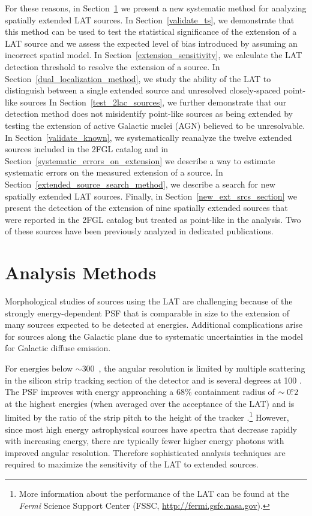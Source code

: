 \documentclass[12pt,preprint]{aastex}
\newcommand{\mev}{\text{MeV}\xspace}
\newcommand{\gev}{\text{GeV}\xspace}
\newcommand{\fermi}{\textit{Fermi}\xspace}
\begin{document}
 For these reasons, in Section~\ref{analysis_methods_section}
we present a new systematic method for analyzing spatially extended
LAT sources.  
In Section~\ref{validate_ts}, we demonstrate
that this method can be used to test the statistical significance of the
extension of a LAT source and we assess the expected level of bias 
introduced by assuming an incorrect spatial model.
In Section~\ref{extension_sensitivity},
we calculate the LAT detection threshold to resolve the extension
of a source.
In Section~\ref{dual_localization_method}, we
study the ability of the LAT to 
distinguish between a single extended source and unresolved closely-spaced point-like sources
In Section~\ref{test_2lac_sources}, we further demonstrate that our
detection method does not misidentify point-like sources as being
extended by testing the extension of active Galactic nuclei (AGN)
believed to be unresolvable.  In Section~\ref{validate_known},
we systematically reanalyze the twelve extended sources included
in the 2FGL catalog and in Section~\ref{systematic_errors_on_extension}
we describe a way to estimate systematic errors on the measured extension of a source.
In Section~\ref{extended_source_search_method}, we
describe a search for new spatially extended LAT sources. Finally,
in Section~\ref{new_ext_srcs_section} we present the detection of the
extension of nine spatially extended sources that were reported in the 2FGL catalog
but treated as point-like in the analysis.  Two of these sources have been previously analyzed in
dedicated publications.


\section{Analysis Methods}
\label{analysis_methods_section}

Morphological studies of sources using the LAT are challenging
because of the strongly energy-dependent PSF that is comparable in
size to the extension of many sources expected to be detected at
\gev energies.  Additional complications arise for sources along
the Galactic plane due to systematic uncertainties in the model for
Galactic diffuse emission.  

For energies below $\sim$300~\mev, the angular resolution is limited by
multiple scattering in the silicon strip tracking section
of the detector and is several degrees at 100 \mev.  The PSF improves
with energy approaching a 68\% containment radius of $\sim0\mbox{$.\!\!^\circ$}2$ at
the highest energies (when averaged over the acceptance of the LAT)
and is limited by the ratio of the strip pitch to the height of the tracker
\citep{atwood_LAT_mission,on_orbit_calibration,lat_on_orbit_psf}.\footnote{More
information about the performance of the LAT can be found at the \fermi
Science Support Center (FSSC, \url{http://fermi.gsfc.nasa.gov}).} However,
since most high energy astrophysical sources have spectra that decrease
rapidly with increasing energy, there are typically fewer higher
energy photons with improved angular resolution. Therefore sophisticated
analysis techniques are required to maximize the sensitivity of the LAT
to extended sources.
\end{document}
